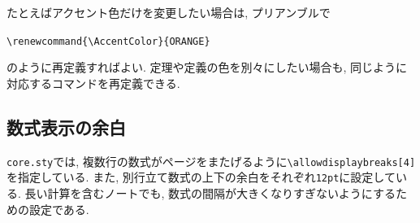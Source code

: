 \documentclass[../main.tex]{subfiles}
\begin{document}
たとえばアクセント色だけを変更したい場合は, プリアンブルで
\begin{center}
	\verb|\renewcommand{\AccentColor}{ORANGE}|
\end{center}
のように再定義すればよい. 
定理や定義の色を別々にしたい場合も, 同じように対応するコマンドを再定義できる. 

\subsection{数式表示の余白}

\texttt{core.sty}では, 複数行の数式がページをまたげるように\verb|\allowdisplaybreaks[4]|を指定している. 
また, 別行立て数式の上下の余白をそれぞれ\texttt{12pt}に設定している. 
長い計算を含むノートでも, 数式の間隔が大きくなりすぎないようにするための設定である. 
\end{document}
